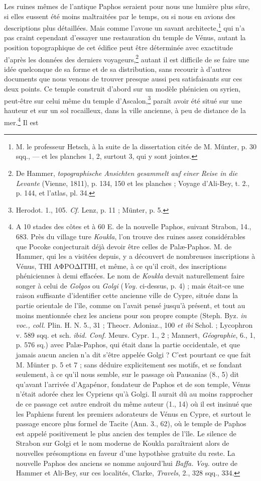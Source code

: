 \documentclass[a4paper, 11pt, oneside, polutonikogreek, french]{article}
\begin{document}
Les ruines mêmes de l'antique Paphos seraient pour nous une lumière plus sûre, si elles eussent été moins maltraitées par le temps, ou si nous en avions des descriptions plus détaillées. Mais comme l'avoue un savant architecte,\footnote{M. le professeur Hetsch, à la suite de la dissertation citée de M. Münter, p. 30 sqq., --- et les planches 1, 2, surtout 3, qui y sont jointes.} qui n'a pas craint cependant d'essayer une restauration du temple de Vénus, autant la position topographique de cet édifice peut être déterminée avec exactitude d'après les données des derniers voyageurs,\footnote{De Hammer, \emph{topographische Ansichten gesammelt auf einer Reise in die Levante} (Vienne, 1811), p. 134, 150 et les planches ; Voyage d'Ali-Bey, t. 2., p. 144, et l'atlas, pl. 34.} autant il est difficile de se faire une idée quelconque de sa forme et de sa distribution, sans recourir à d'autres documents que nous venons de trouver presque aussi peu satisfaisants sur ces deux points. Ce temple construit d'abord sur un modèle phénicien ou syrien, peut-être sur celui même du temple d'Ascalon,\footnote{Herodot. 1., 105. \emph{Cf.} Lenz, p. 11 ; Münter, p. 5.} paraît avoir été situé sur une hauteur et sur un sol rocailleux, dans la ville ancienne, à peu de distance de la mer.\footnote{A 10 stades des côtes et à 60 E. de la nouvelle Paphos, suivant Strabon, 14., 683. Près du village ture \emph{Koukla}, l'on trouve des ruines assez considérables que Pocoke conjecturait déjà devoir être celles de Palæ-Paphos. M. de Hammer, qui les a visitées depuis, y a découvert de nombreuses inscriptions à Vénus, ΤΗΙ ΑΦΡΟΔΙΤΗΙ, et même, à ce qu'il croit, des inscriptions phéniciennes à demi effacées. Le nom de \emph{Koukla} devait naturellement faire songer à celui de \emph{Golgos} ou \emph{Golgi} (\emph{Voy.} ci-dessus, p. 4) ; mais était-ce une raison suffisante d'identifier cette ancienne ville de Cypre, située dans la partie orientale de l'île, comme on l'avait pensé jusqu'à présent, et tout au moins mentionnée chez les anciens pour son propre compte (Steph. Byz. \emph{in voc., coll.} Plin. H. N. 5., 31 ; Theocr. Adoniaz., 100 \emph{et ibi} Schol. ; Lycophron v. 589 sqq. et sch. \emph{ibid. Conf.} Meurs. Cypr. 1., 2 ; Mannert, \emph{Géographie}, 6., 1, p. 576 sq.) avec Palæ-Paphos, qui était dans la partie occidentale, et que jamais aucun ancien n'a dit s'être appelée Golgi ? C'est pourtant ce que fait M. Münter p. 5 et 7 ; sans déduire explicitement ses motifs, et se fondant seulement, à ce qu'il nous semble, sur le passage où Pausanias (8., 5) dit qu'avant l'arrivée d'Agapénor, fondateur de Paphos et de son temple, Vénus n'était adorée chez les Cypriens qu'à Golgi. Il aurait dû au moins rapprocher de ce passage cet autre endroit du même auteur (1., 14) où il est insinué que les Paphiens furent les premiers adorateurs de Vénus en Cypre, et surtout le passage encore plus formel de Tacite (Ann. 3., 62), où le temple de Paphos est appelé positivement le plus ancien des temples de l'île. Le silence de Strabon sur Golgi et le nom moderne de Koukla paraîtraient alors de nouvelles présomptions en faveur d'une hypothèse gratuite du reste. La nouvelle Paphos des anciens se nomme aujourd'hui \emph{Baffa.} \emph{Voy.} outre de Hammer et Ali-Bey, sur ces localités, Clarke, \emph{Travels}, 2., 328 sqq., 334.} Il est 
\end{document}
